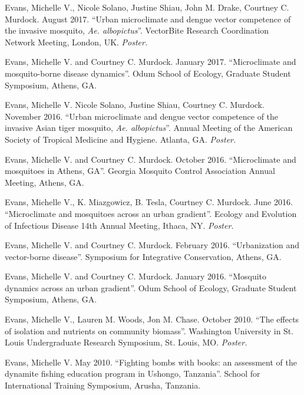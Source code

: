 \begin{cvitems}
	\item Evans, Michelle V., Nicole Solano, Justine Shiau, John M. Drake, Courtney C. Murdock. August 2017. ``Urban microclimate and dengue vector competence of the invasive mosquito, \textit{Ae. albopictus}''. VectorBite Research Coordination Network Meeting, London, UK. \textit{Poster.}

	\item Evans, Michelle V. and Courtney C. Murdock. January 2017. ``Microclimate and mosquito-borne disease dynamics''. Odum School of Ecology, Graduate Student Symposium, Athens, GA.

	\item Evans, Michelle V. Nicole Solano, Justine Shiau, Courtney C. Murdock. November 2016. ``Urban microclimate and dengue vector competence of the invasive Asian tiger mosquito, \textit{Ae. albopictus}''. Annual Meeting of the American Society of Tropical Medicine and Hygiene. Atlanta, GA. \textit{Poster.}

	\item Evans, Michelle V. and Courtney C. Murdock. October 2016. ``Microclimate and mosquitoes in Athens, GA''. Georgia Mosquito Control Association Annual Meeting, Athens, GA.

	\item Evans, Michelle V., K. Miazgowicz, B. Tesla, Courtney C. Murdock. June 2016. ``Microclimate and mosquitoes across an urban gradient''. Ecology and Evolution of Infectious Disease 14th Annual Meeting, Ithaca, NY. \textit{Poster.}

	\item Evans, Michelle V. and Courtney C. Murdock. February 2016. ``Urbanization and vector-borne disease''. Symposium for Integrative Conservation, Athens, GA.

	\item Evans, Michelle V. and Courtney C. Murdock. January 2016. ``Mosquito dynamics across an urban gradient''. Odum School of Ecology, Graduate Student Symposium, Athens, GA.

	\item Evans, Michelle V., Lauren M. Woods, Jon M. Chase. October 2010. ``The effects of isolation and nutrients on community biomass''. Washington University in St. Louis Undergraduate Research Symposium, St. Louis, MO. \textit{Poster.}

	\item Evans, Michelle V. May 2010. ``Fighting bombs with books: an assessment of the dynamite fishing education program in Ushongo, Tanzania''. School for International Training Symposium, Arusha, Tanzania.

	\bigskip
\end{cvitems}
